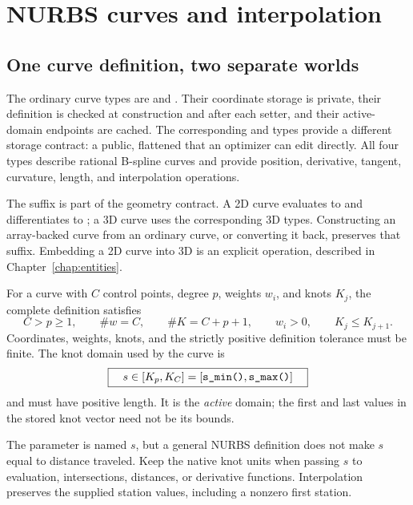 \chapter{NURBS curves and interpolation}
\label{chap:splines}

\section{One curve definition, two separate worlds}

The ordinary curve types are  and
. Their coordinate storage is private, their definition
is checked at construction and after each setter, and their active-domain
endpoints are cached. The corresponding  and
 types provide a different storage contract: a
public, flattened  that an optimizer can edit directly.
All four types describe rational B-spline curves and provide position,
derivative, tangent, curvature, length, and interpolation operations.

The suffix is part of the geometry contract. A 2D curve evaluates to
 and differentiates to ; a 3D curve uses
the corresponding 3D types. Constructing an array-backed curve from an ordinary
curve, or converting it back, preserves that suffix. Embedding a 2D curve into
3D is an explicit  operation, described in
Chapter~\ref{chap:entities}.

For a curve with $C$ control points, degree $p$, weights $w_i$, and knots $K_j$,
the complete definition satisfies
\begin{equation}
 C>p\geq1,\qquad \#w=C,\qquad \#K=C+p+1,
 \qquad w_i>0,\qquad K_j\leq K_{j+1}.
\end{equation}
Coordinates, weights, knots, and the strictly positive definition tolerance
must be finite. The knot domain used by the curve is
\begin{equation}
\boxed{\quad s\in[K_p,K_C]=[\api{s_min()},\api{s_max()}]\quad}
\label{eq:spline-domain}
\end{equation}
and must have positive length. It is the \emph{active} domain; the first and
last values in the stored knot vector need not be its bounds.

\begin{manualnote}
The parameter is named $s$, but a general NURBS definition does not make $s$
equal to distance traveled. Keep the native knot units when passing $s$ to
evaluation, intersections, distances, or derivative functions. Interpolation
preserves the supplied station values, including a nonzero first station.
\end{manualnote}

